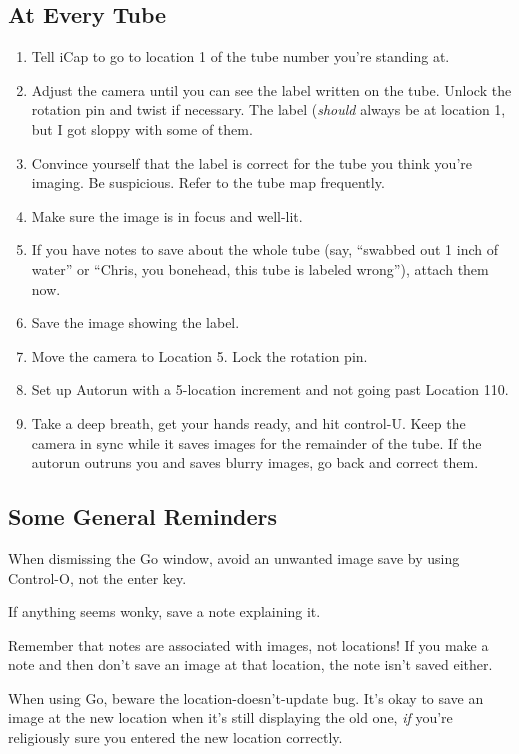 \documentclass[11pt]{article}
\begin{document}
\subsection{At Every Tube}
	\begin{enumerate}
		\item{Tell iCap to go to location 1 of the tube number you're standing at.}
		\item{Adjust the camera until you can see the label written on the tube. Unlock the rotation pin and twist if necessary. The label (\textit{should} always be at location 1, but I got sloppy with some of them.}
		\item{Convince yourself that the label is correct for the tube you think you're imaging. Be suspicious. Refer to the tube map frequently.}
		\item{Make sure the image is in focus and well-lit.}
		\item{If you have notes to save about the whole tube (say, ``swabbed out 1 inch of water'' or ``Chris, you bonehead, this tube is labeled wrong''), attach them now.}
		\item{Save the image showing the label.}
		\item{Move the camera to Location 5. Lock the rotation pin.}
		\item{Set up Autorun with a 5-location increment and not going past Location 110.}
		\item{Take a deep breath, get your hands ready, and hit control-U. Keep the camera in sync while it saves images for the remainder of the tube. If the autorun outruns you and saves blurry images, go back and correct them.}
	\end{enumerate}	

\subsection{Some General Reminders}

	When dismissing the Go window, avoid an unwanted image save by using Control-O, not the enter key.
	
	If anything seems wonky, save a note explaining it.
	
	Remember that notes are associated with images, not locations! If you make a note and then don't save an image at that location, the note isn't saved either.
	
	When using Go, beware the location-doesn't-update bug. It's okay to save an image at the new location when it's still displaying the old one, \textit{if} you're religiously sure you entered the new location correctly.
	
\end{document}
